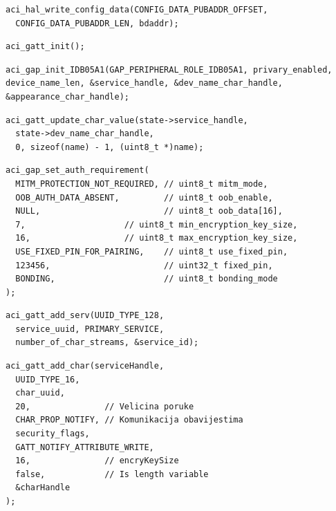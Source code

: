 \documentclass[times, utf8, diplomski]{diplomski}
\begin{document}
\begin{lstlisting}[caption={Postavi MAC adresu}, label={firstinit}]
aci_hal_write_config_data(CONFIG_DATA_PUBADDR_OFFSET,
  CONFIG_DATA_PUBADDR_LEN, bdaddr);
\end{lstlisting}

\begin{lstlisting}[caption={Inicijaliziraj gatt podsustav}]
aci_gatt_init();
\end{lstlisting}

\begin{lstlisting}[caption={Inicijaliziraj gap podsustav}]
aci_gap_init_IDB05A1(GAP_PERIPHERAL_ROLE_IDB05A1, privary_enabled, device_name_len, &service_handle, &dev_name_char_handle, &appearance_char_handle);
\end{lstlisting}

\begin{lstlisting}[caption={Postavi ime kojim će se predstavljati ostalim Bluetooth uređajima.}]
aci_gatt_update_char_value(state->service_handle,
  state->dev_name_char_handle,
  0, sizeof(name) - 1, (uint8_t *)name);
\end{lstlisting}

\begin{lstlisting}[caption={Postavi autentifikacijske zahtjeve}]
aci_gap_set_auth_requirement(
  MITM_PROTECTION_NOT_REQUIRED, // uint8_t mitm_mode,
  OOB_AUTH_DATA_ABSENT,         // uint8_t oob_enable,
  NULL,                         // uint8_t oob_data[16],
  7,                    // uint8_t min_encryption_key_size,
  16,                   // uint8_t max_encryption_key_size,
  USE_FIXED_PIN_FOR_PAIRING,    // uint8_t use_fixed_pin,
  123456,                       // uint32_t fixed_pin,
  BONDING,                      // uint8_t bonding_mode
);
\end{lstlisting}

\begin{lstlisting}[caption={Postavljanje servisa koji sadrži karakteristične tokove}]
aci_gatt_add_serv(UUID_TYPE_128,
  service_uuid, PRIMARY_SERVICE,
  number_of_char_streams, &service_id);
\end{lstlisting}

\begin{lstlisting}[caption={Postavljanje karakterističnih tokova}]
aci_gatt_add_char(serviceHandle,
  UUID_TYPE_16,
  char_uuid,
  20,               // Velicina poruke
  CHAR_PROP_NOTIFY, // Komunikacija obavijestima
  security_flags,
  GATT_NOTIFY_ATTRIBUTE_WRITE,
  16,               // encryKeySize
  false,            // Is length variable
  &charHandle
);
\end{lstlisting}
\end{document}
